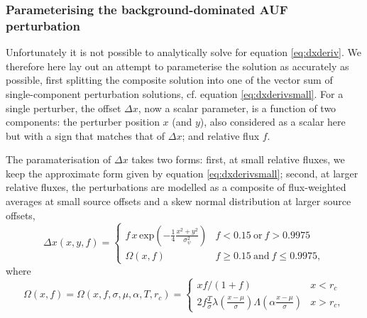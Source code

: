 \documentclass[fleqn,usenatbib]{mnras}
\begin{document}
\subsubsection{Parameterising the background-dominated AUF perturbation}
Unfortunately it is not possible to analytically solve for equation \ref{eq:dxderiv}. We therefore here lay out an attempt to parameterise the solution as accurately as possible, first splitting the composite solution into one of the vector sum of single-component perturbation solutions, cf. equation \ref{eq:dxderivsmall}. For a single perturber, the offset $\Delta x$, now a scalar parameter, is a function of two components: the perturber position $x$ (and $y$), also considered as a scalar here but with a sign that matches that of $\Delta x$; and relative flux $f$.

The paramaterisation of $\Delta x$ takes two forms: first, at small relative fluxes, we keep the approximate form given by equation \ref{eq:dxderivsmall}; second, at larger relative fluxes, the perturbations are modelled as a composite of flux-weighted averages at small source offsets and a skew normal distribution at larger source offsets,
\begin{equation}
    \Delta x(x, y, f) =
    \begin{cases}
    f\,x\,\mathrm{exp}\left(-\frac{1}{4}\frac{x^2 + y^2}{\sigma_\psi^2}\right) & f < 0.15\ \mathrm{or}\ f > 0.9975 \\
    \Omega(x, f) & f \geq 0.15\ \mathrm{and}\ f \leq 0.9975,
    \end{cases}
\label{eq:deltaxparam}
\end{equation}
where
\begin{equation}
    \Omega(x, f) = \Omega(x, f, \sigma, \mu, \alpha, T, r_c) =
    \begin{cases}
    x f/(1 + f) & x < r_c \\
    2 f \frac{T}{\sigma}\lambda\left(\frac{x - \mu}{\sigma}\right)\Lambda\left(\alpha\frac{x - \mu}{\sigma}\right) & x > r_c,
    \end{cases}
\label{eq:omega}
\end{equation}
\end{document}
